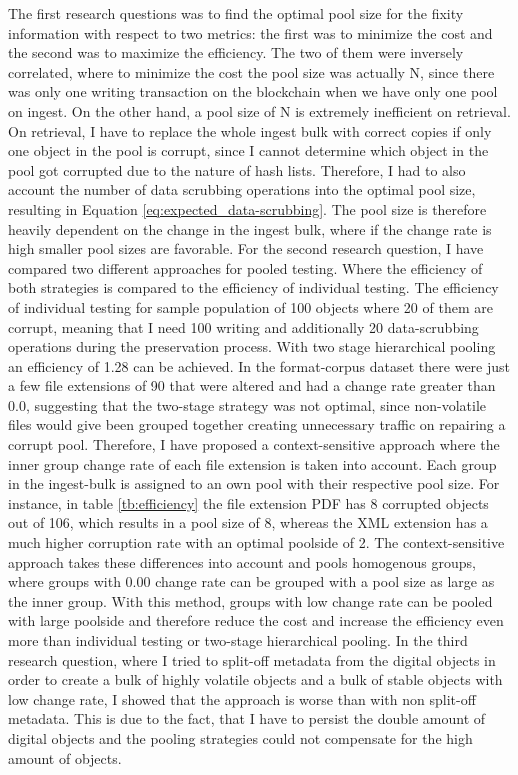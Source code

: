 The first research questions was to find the optimal pool size for the fixity information with respect to two metrics: the first was to minimize the cost and the second was to maximize the efficiency. The two of them were inversely correlated, where to minimize the cost the pool size was actually N, since there was only one writing transaction on the blockchain when we have only one pool on ingest. On the other hand, a pool size of N is extremely inefficient on retrieval. On retrieval, I have to replace the whole ingest bulk with correct copies if only one object in the pool is corrupt, since I cannot determine which object in the pool got corrupted due to the nature of hash lists. Therefore, I had to also account the number of data scrubbing operations into the optimal pool size, resulting in Equation \ref{eq:expected_data-scrubbing}. The pool size is therefore heavily dependent on the change in the ingest bulk, where if the change rate is high smaller pool sizes are favorable.
For the second research question, I have compared two different approaches for pooled testing. Where the efficiency of both strategies is compared to the efficiency of individual testing. The efficiency of individual testing for sample population of 100 objects where 20 of them are corrupt, meaning that I need 100 writing and additionally 20 data-scrubbing operations during the preservation process. With two stage hierarchical pooling an efficiency of 1.28 can be achieved. In the format-corpus dataset there were just a few file extensions of 90 that were altered and had a change rate greater than 0.0, suggesting that the two-stage strategy was not optimal, since non-volatile files would give been grouped together creating unnecessary traffic on repairing a corrupt pool. Therefore, I have proposed a context-sensitive approach where the inner group change rate of each file extension is taken into account. Each group in the ingest-bulk is assigned to an own pool with their respective pool size. For instance, in table \ref{tb:efficiency} the file extension PDF has 8 corrupted objects out of 106, which results in a pool size of 8, whereas the XML extension has a much higher corruption rate with an optimal poolside of 2. The context-sensitive approach takes these differences into account and pools homogenous groups, where groups with 0.00 change rate can be grouped with a pool size as large as the inner group. With this method, groups with low change rate can be pooled with large poolside and therefore reduce the cost and increase the efficiency even more than individual testing or two-stage hierarchical pooling.
In the third research question, where I tried to split-off metadata from the digital objects in order to create a bulk of highly volatile objects and a bulk of stable objects with low change rate, I showed that the approach is worse than with non split-off metadata. This is due to the fact, that I have to persist the double amount of digital objects and the pooling strategies could not compensate for the high amount of objects.


